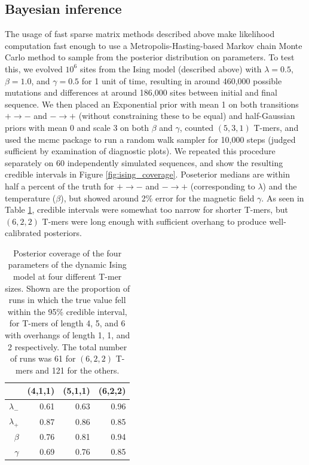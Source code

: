 \documentclass{article}
\theoremstyle{plain}
\theoremstyle{definition}
\begin{document}
\subsection{Bayesian inference}

The usage of fast sparse matrix methods described above make likelihood computation fast enough
to use a Metropolis-Hasting-based Markov chain Monte Carlo method
to sample from the posterior distribution on parameters.
To test this,
we evolved $10^6$ sites from the Ising model (described above) with $\lambda=0.5$, $\beta=1.0$, and $\gamma=0.5$
for 1 unit of time, 
resulting in around 460,000 possible mutations
and differences at around 186,000 sites between initial and final sequence.
We then placed an Exponential prior with mean 1 on both transitions $+ \to -$ and $- \to +$
(without constraining these to be equal)
and half-Gaussian priors with mean 0 and scale 3 on both $\beta$ and $\gamma$,
counted $(5,3,1)$ T-mers,
and used the mcmc package \citep{mcmcR} to run a random walk sampler for 10,000 steps
(judged sufficient by examination of diagnostic plots).
We repeated this procedure separately on 60 independently simulated sequences,
and show the resulting credible intervals in Figure \ref{fig:ising_coverage}.
Poseterior medians are within half a percent of the truth for $+ \to -$ and $- \to +$ (corresponding to $\lambda$)
and the temperature ($\beta$), but showed around 2\% error for the magnetic field $\gamma$.
As seen in Table \ref{tab:ising_coverage}, 
credible intervals were somewhat too narrow for shorter T-mers,
but $(6,2,2)$ T-mers were long enough with sufficient overhang to produce well-calibrated posteriors.

\begin{table}[ht]
\centering
\begin{tabular}{rrrr}
  \hline
    & (4,1,1) & (5,1,1) & (6,2,2) \\ 
  \hline
  $\lambda_-$ & 0.61 & 0.63 & 0.96 \\ 
  $\lambda_+$ & 0.87 & 0.86 & 0.85 \\ 
  $\beta$     & 0.76 & 0.81 & 0.94 \\ 
  $\gamma$    & 0.69 & 0.76 & 0.85 \\ 
   \hline
\end{tabular}
    \caption{
        Posterior coverage of the four parameters of the dynamic Ising model at four different T-mer sizes.
        Shown are the proportion of runs in which the true value fell within the 95\% credible interval,
        for T-mers of length 4, 5, and 6 with overhangs of length 1, 1, and 2 respectively.
        The total number of runs was 61 for $(6,2,2)$ T-mers and 121 for the others.
        \label{tab:ising_coverage}
    }
\end{table}
\end{document}
